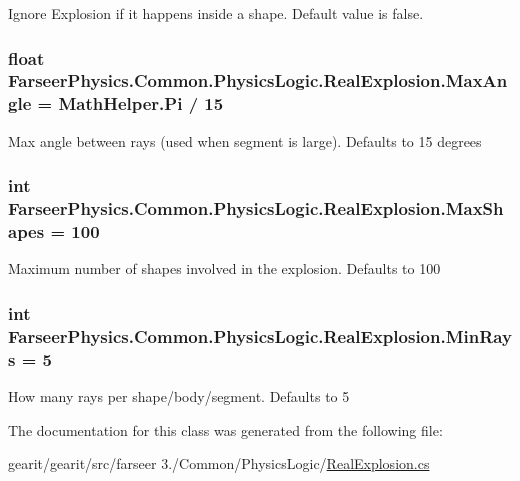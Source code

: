 Ignore Explosion if it happens inside a shape. Default value is false. 

\hypertarget{class_farseer_physics_1_1_common_1_1_physics_logic_1_1_real_explosion_a8fa507ae446fa078565c2a2abedd863c}{
\subsubsection[{Max\+Angle}]{\setlength{\rightskip}{0pt plus 5cm}float Farseer\+Physics.\+Common.\+Physics\+Logic.\+Real\+Explosion.\+Max\+Angle = Math\+Helper.\+Pi / 15}}\label{class_farseer_physics_1_1_common_1_1_physics_logic_1_1_real_explosion_a8fa507ae446fa078565c2a2abedd863c}


Max angle between rays (used when segment is large). Defaults to 15 degrees 

\hypertarget{class_farseer_physics_1_1_common_1_1_physics_logic_1_1_real_explosion_ab24c79aade56953ea56d3001750f0d50}{
\subsubsection[{Max\+Shapes}]{\setlength{\rightskip}{0pt plus 5cm}int Farseer\+Physics.\+Common.\+Physics\+Logic.\+Real\+Explosion.\+Max\+Shapes = 100}}\label{class_farseer_physics_1_1_common_1_1_physics_logic_1_1_real_explosion_ab24c79aade56953ea56d3001750f0d50}


Maximum number of shapes involved in the explosion. Defaults to 100 

\hypertarget{class_farseer_physics_1_1_common_1_1_physics_logic_1_1_real_explosion_a826a15fb3f9d58191a2d5f0b54f3e15c}{
\subsubsection[{Min\+Rays}]{\setlength{\rightskip}{0pt plus 5cm}int Farseer\+Physics.\+Common.\+Physics\+Logic.\+Real\+Explosion.\+Min\+Rays = 5}}\label{class_farseer_physics_1_1_common_1_1_physics_logic_1_1_real_explosion_a826a15fb3f9d58191a2d5f0b54f3e15c}


How many rays per shape/body/segment. Defaults to 5 



The documentation for this class was generated from the following file\+:\begin{DoxyCompactItemize}
\item 
gearit/gearit/src/farseer 3./\+Common/\+Physics\+Logic/\hyperlink{_real_explosion_8cs}{Real\+Explosion.\+cs}\end{DoxyCompactItemize}
